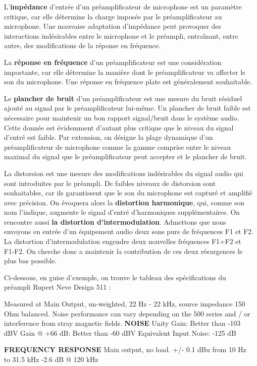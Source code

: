 \documentclass[
  letterpaper,
  DIV=11,
  numbers=noendperiod]{scrreprt}
\begin{document}
L'\textbf{impédance} d'entrée d'un préamplificateur de microphone est un
paramètre critique, car elle détermine la charge imposée par le
préamplificateur au microphone. Une mauvaise adaptation d'impédance peut
provoquer des interactions indésirables entre le microphone et le
préampli, entraînant, entre autre, des modifications de la réponse en
fréquence.

La \textbf{réponse en fréquence} d'un préamplificateur est une
considération importante, car elle détermine la manière dont le
préamplificateur va affecter le son du microphone. Une réponse en
fréquence plate est généralement souhaitable.

Le \textbf{plancher de bruit} d'un préamplificateur est une mesure du
bruit résiduel ajouté au signal par le préamplificateur lui-même. Un
plancher de bruit faible est nécessaire pour maintenir un bon rapport
signal/bruit dans le système audio. Cette donnée est évidemment d'autant
plus critique que le niveau du signal d'entré est faible. Par extension,
on désigne la plage dynamique d'un préamplificateur de microphone comme
la gamme comprise entre le niveau maximal du signal que le
préamplificateur peut accepter et le plancher de bruit.

La distorsion est une mesure des modifications indésirables du signal
audio qui sont introduites par le préampli. De faibles niveaux de
distorsion sont souhaitables, car ils garantissent que le son du
microphone est capturé et amplifié avec précision. On évoquera alors la
\textbf{distortion harmonique}, qui, comme son nom l'indique, augmente
le signal d'entré d'harmoniques supplémentaires. On rencontre aussi
\textbf{la distortion d'intermodulation}. Admettons que nous envoyons en
entrée d'un équipement audio deux sons purs de fréquences F1 et F2. La
distortion d'intermodulation engendre deux nouvelles fréquences F1+F2 et
F1-F2. On cherche donc a maintenir la contribution de ces deux
résurgences le plus bas possible.

Ci-dessous, en guise d'exemple, on trouve le tableau des spécifications
du préampli Rupert Neve Design 511 :

Measured at Main Output, un-weighted, 22 Hz - 22 kHz, source impedance
150 Ohm balanced. Noise performance can vary depending on the 500 series
and / or interference from stray magnetic fields. \textbf{NOISE} Unity
Gain: Better than -103 dBV Gain @ +66 dB: Better than -60 dBV Equivalent
Input Noise: -125 dB

\textbf{FREQUENCY RESPONSE} Main output, no load. +/- 0.1 dBu from 10 Hz
to 31.5 kHz -2.6 dB @ 120 kHz
\end{document}
